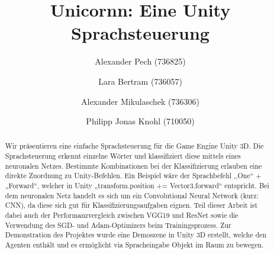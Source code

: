 \documentclass[sigconf]{acmart}
\begin{document}
\title{Unicornn: Eine Unity Sprachsteuerung}

\author{Alexander Pech (736825)}

\author{Lara Bertram (736057)}

\author{Alexander Mikulaschek (736306)}

\author{Philipp Jonas Knohl (710050)}

\begin{abstract}
Wir präsentieren eine einfache Sprachsteuerung für die Game Engine Unity 3D. Die Sprachsteuerung erkennt einzelne Wörter und klassifiziert diese mittels eines neuronalen Netzes. Bestimmte Kombinationen bei der Klassifizierung erlauben eine direkte Zuordnung zu Unity-Befehlen.  
Ein Beispiel wäre der Sprachbefehl ,,One“ + „Forward“, welcher in Unity „transform.position += Vector3.forward“ entspricht.
\newline
\newline
Bei dem neuronalen Netz handelt es sich um ein Convolutional Neural Network (kurz: CNN), da diese sich gut für Klassifizierungsaufgaben eignen. Teil dieser Arbeit ist dabei auch der Performanzvergleich zwischen VGG19 \cite{simonyan2014deep} und ResNet \cite{he2015deep} sowie die Verwendung des SGD- und Adam-Optimizers beim Trainingsprozess. 
Zur Demonstration des Projektes wurde eine Demoszene in Unity 3D erstellt, welche den Agenten enthält und es ermöglicht via Spracheingabe Objekt im Raum zu bewegen. 
\end{abstract}

\end{document}
